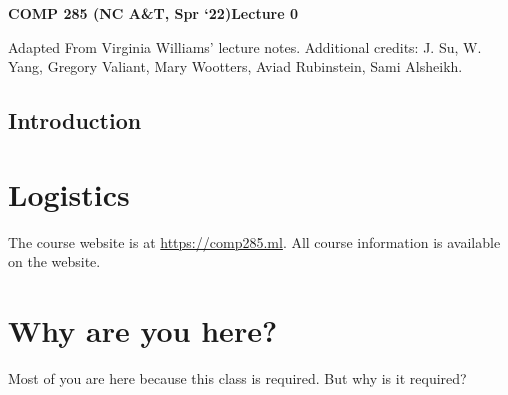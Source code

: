 \documentclass [12pt]{article}
\begin{document}
 

{\LARGE \textbf {COMP 285 (NC A\&T, Spr `22)}\hfill \textbf {Lecture 0} } 
\vspace {1em} 
\begin {Instruction} 

Adapted From Virginia Williams’ lecture notes. Additional credits: J. Su, W. Yang, Gregory Valiant, Mary Wootters, Aviad Rubinstein, Sami Alsheikh.
\end {Instruction} 

\begin{centering}
\section*{Introduction}
\end{centering}

\section{Logistics}

The course website is at \url{https://comp285.ml}. All course information is available on the website.

\section{Why are you here?}

Most of you are here because this class is required. But why is it required?
\end{document}
